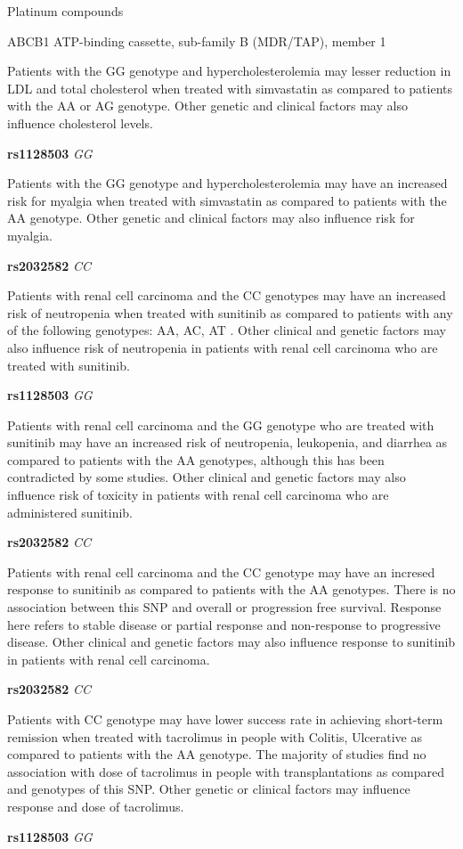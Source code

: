 \documentclass{resume} %
\begin{document}
\begin{rSection}{ Platinum compounds }
\begin{rSubsection}{ ABCB1 }{ ATP-binding cassette, sub-family B (MDR/TAP), member 1 }{}{}
\item[] Patients with the GG genotype and hypercholesterolemia may lesser reduction in LDL and total cholesterol when treated with simvastatin as compared to patients with the AA or AG genotype. Other genetic and clinical factors may also influence cholesterol levels.\item \textbf{ rs1128503 } \textit{ GG }
\item[] Patients with the GG genotype and hypercholesterolemia may have an increased risk for myalgia when treated with simvastatin as compared to patients with the AA genotype. Other genetic and clinical factors may also influence risk for myalgia.\item \textbf{ rs2032582 } \textit{ CC }
\item[] Patients with renal cell carcinoma and the CC genotypes may have an increased risk of neutropenia when treated with sunitinib as compared to patients with any of the following genotypes: AA, AC, AT . Other clinical and genetic factors may also influence risk of neutropenia in patients with renal cell carcinoma who are treated with sunitinib.\item \textbf{ rs1128503 } \textit{ GG }
\item[] Patients with renal cell carcinoma and the GG genotype who are treated with sunitinib may have an increased risk of  neutropenia, leukopenia, and diarrhea as compared to patients with the AA genotypes, although this has been contradicted by some studies. Other clinical and genetic factors may also influence risk of toxicity in patients with renal cell carcinoma who are administered sunitinib.\item \textbf{ rs2032582 } \textit{ CC }
\item[] Patients with renal cell carcinoma and the CC genotype may have an incresed response to sunitinib as compared to patients with the AA genotypes. There is no association between this SNP and overall or progression free survival.   Response here refers to stable disease or partial response and non-response to progressive disease. Other clinical and genetic factors may also influence response to sunitinib in patients with renal cell carcinoma. \item \textbf{ rs2032582 } \textit{ CC }
\item[] Patients with CC genotype may have lower success rate in achieving short-term remission when treated with tacrolimus in people with Colitis, Ulcerative as compared to patients with the AA genotype. The majority of studies find no association with dose of tacrolimus in people with transplantations as compared and genotypes of this SNP. Other genetic or clinical factors may influence response and dose of tacrolimus.\item \textbf{ rs1128503 } \textit{ GG }

\end{rSubsection}
\end{rSection}
\end{document}
